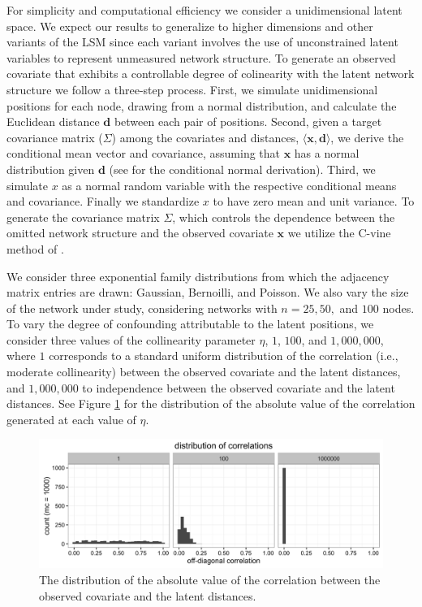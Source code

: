 \documentclass[11pt]{article}
\begin{document}
For simplicity and computational efficiency we consider a
unidimensional latent space. We expect our results to generalize to
higher dimensions and other variants of the LSM since each variant
involves the use of unconstrained latent variables to represent
unmeasured network structure. To generate an observed covariate that
exhibits a controllable degree of colinearity with the latent network
structure we follow a three-step process. First, we simulate
unidimensional positions for each node, drawing from a normal
distribution, and calculate the Euclidean distance $\mathbf{d}$
between each pair of positions. Second, given a target covariance
matrix ($\Sigma$) among the covariates and distances, $\langle
\mathbf{x}, \mathbf{d} \rangle$, we derive the conditional mean vector
and covariance, assuming that $\mathbf{x}$ has a normal distribution
given $\mathbf{d}$ (see \cite[pp. 116--117]{eaton1983} for the
conditional normal derivation). Third, we simulate $x$ as a normal
random variable with the respective conditional means and
covariance. Finally we standardize $x$ to have zero mean and unit
variance. To generate the covariance matrix $\Sigma$, which controls
the dependence between the omitted network structure and the observed
covariate $\mathbf{x}$ we utilize the C-vine method of
\cite{lewandowski2009generating}.

We consider three exponential family distributions from which the
adjacency matrix entries are drawn: Gaussian, Bernoilli, and
Poisson. We also vary the size of the network under study, considering
networks with $n = 25, 50,$ and $100$ nodes. To vary the degree of
confounding attributable to the latent positions, we consider three
values of the collinearity parameter $\eta$, $1$, $100$, and
$1,000,000$, where $1$ corresponds to a standard uniform distribution
of the correlation (i.e., moderate collinearity) between the observed
covariate and the latent distances, and $1,000,000$ to independence
between the observed covariate and the latent distances. See Figure
\ref{fig:vine} for the distribution of the absolute value of the
correlation generated at each value of $\eta$.

\begin{figure}
\includegraphics[width=\textwidth]{figures/max_r_vine.png}
\caption{The distribution of the absolute value of the correlation between the observed covariate and the latent distances. \label{fig:vine}}
\end{figure}
\end{document}
